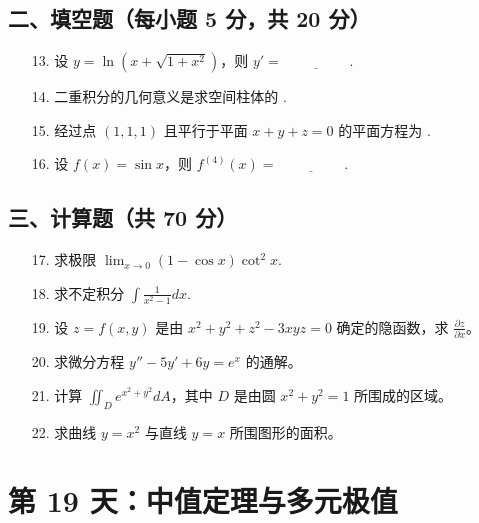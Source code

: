 \documentclass[11pt,a4paper]{article}
\begin{document}
\subsection*{二、填空题（每小题 5 分，共 20 分）}
\begin{enumerate}
    \item[13.] 设 $y = \ln(x + \sqrt{1+x^2})$，则 $y' = \underline{\hspace{2cm}}$.
    \item[14.] 二重积分的几何意义是求空间柱体的 \underline{\hspace{2cm}}.
    \item[15.] 经过点 $(1,1,1)$ 且平行于平面 $x+y+z=0$ 的平面方程为 \underline{\hspace{2cm}}.
    \item[16.] 设 $f(x) = \sin x$，则 $f^{(4)}(x) = \underline{\hspace{2cm}}$.
\end{enumerate}
\subsection*{三、计算题（共 70 分）}
\begin{enumerate}
    \item[17.] 求极限 $\lim_{x \to 0} (1 - \cos x) \cot^2 x$.
    \item[18.] 求不定积分 $\int \frac{1}{x^2-1} dx$.
    \item[19.] 设 $z = f(x, y)$ 是由 $x^2+y^2+z^2-3xyz=0$ 确定的隐函数，求 $\frac{\partial z}{\partial x}$。
    \item[20.] 求微分方程 $y'' - 5y' + 6y = e^x$ 的通解。
    \item[21.] 计算 $\iint_D e^{x^2+y^2} dA$，其中 $D$ 是由圆 $x^2+y^2=1$ 所围成的区域。
    \item[22.] 求曲线 $y = x^2$ 与直线 $y=x$ 所围图形的面积。
\end{enumerate}

\newpage

\section*{第 19 天：中值定理与多元极值}
\end{document}
